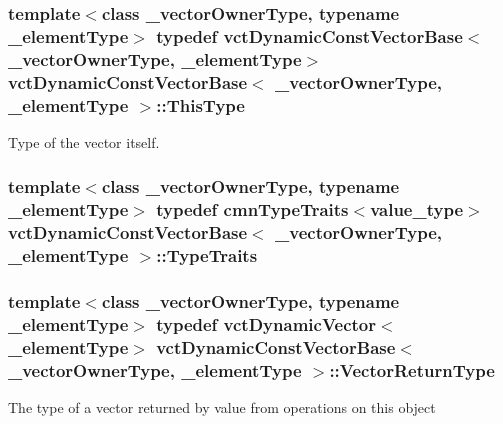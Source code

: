 \subsubsection[{This\+Type}]{\setlength{\rightskip}{0pt plus 5cm}template$<$class \+\_\+vector\+Owner\+Type, typename \+\_\+element\+Type$>$ typedef {\bf vct\+Dynamic\+Const\+Vector\+Base}$<$\+\_\+vector\+Owner\+Type, \+\_\+element\+Type$>$ {\bf vct\+Dynamic\+Const\+Vector\+Base}$<$ \+\_\+vector\+Owner\+Type, \+\_\+element\+Type $>$\+::{\bf This\+Type}}\label{classvct_dynamic_const_vector_base_a39da273523717f678f54d3321ebca3dd}
Type of the vector itself. \hypertarget{classvct_dynamic_const_vector_base_a83723d7033db878894d4ab6c39bda2a4}{}
\subsubsection[{Type\+Traits}]{\setlength{\rightskip}{0pt plus 5cm}template$<$class \+\_\+vector\+Owner\+Type, typename \+\_\+element\+Type$>$ typedef {\bf cmn\+Type\+Traits}$<$value\+\_\+type$>$ {\bf vct\+Dynamic\+Const\+Vector\+Base}$<$ \+\_\+vector\+Owner\+Type, \+\_\+element\+Type $>$\+::{\bf Type\+Traits}}\label{classvct_dynamic_const_vector_base_a83723d7033db878894d4ab6c39bda2a4}
\hypertarget{classvct_dynamic_const_vector_base_a379e4153bb82059072257410945bf83c}{}
\subsubsection[{Vector\+Return\+Type}]{\setlength{\rightskip}{0pt plus 5cm}template$<$class \+\_\+vector\+Owner\+Type, typename \+\_\+element\+Type$>$ typedef {\bf vct\+Dynamic\+Vector}$<$\+\_\+element\+Type$>$ {\bf vct\+Dynamic\+Const\+Vector\+Base}$<$ \+\_\+vector\+Owner\+Type, \+\_\+element\+Type $>$\+::{\bf Vector\+Return\+Type}}\label{classvct_dynamic_const_vector_base_a379e4153bb82059072257410945bf83c}
The type of a vector returned by value from operations on this object \hypertarget{classvct_dynamic_const_vector_base_a8ffd0619835fb50d43c07502d231e6c8}{}
